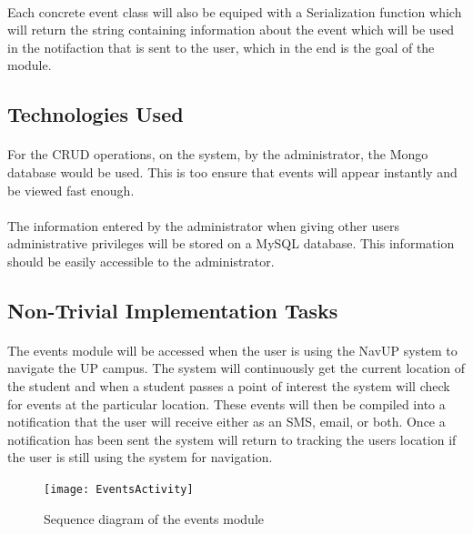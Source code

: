 \documentclass{article}
\begin{document}
\paragraph{} Each concrete event class will also be equiped with a Serialization function which will return the string containing information about the event which will be used in the notifaction that is sent to the user, which in the end is the goal of the module.  

\subsection{Technologies Used}
\paragraph{} For the CRUD operations, on the system, by the administrator, the Mongo database would be used. This is too ensure that events will appear instantly and be viewed fast enough.

\paragraph{} The information entered by the administrator when giving other users administrative privileges will be stored on a MySQL database. This information should be easily accessible to the administrator.


\subsection{Non-Trivial Implementation Tasks}
\paragraph{} The events module will be accessed when the user is using the NavUP system to navigate the UP campus. The system will continuously get the current location of the student and when a student passes a point of interest the system will check for events at the particular location. These events will then be compiled into a notification that the user will receive either as an SMS, email, or both. Once a notification has been sent the system will return to tracking the users location if the user is still using the system for navigation.\\

\begin{figure}[H]
\centering
\texttt{[image: EventsActivity]}
\caption{Sequence diagram of the events module}
\end{figure}
\end{document}

